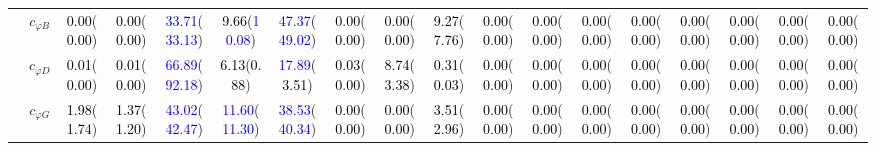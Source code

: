 \documentclass{article}
\begin{document}
\begin{landscape}
\begin{table}[H]
\begin{tabular}{|c|c|c|c|c|c|c|c|c|c|c|c|c|c|c|c|c|c|}
 & $c_{\varphi B}$ & \textcolor{black}{0.00}(\textcolor{black}{0.00}) & \textcolor{black}{0.00}(\textcolor{black}{0.00}) & \textcolor{blue}{33.71}(\textcolor{blue}{33.13}) & \textcolor{black}{9.66}(\textcolor{blue}{10.08}) & \textcolor{blue}{47.37}(\textcolor{blue}{49.02}) & \textcolor{black}{0.00}(\textcolor{black}{0.00}) & \textcolor{black}{0.00}(\textcolor{black}{0.00}) & \textcolor{black}{9.27}(\textcolor{black}{7.76}) & \textcolor{black}{0.00}(\textcolor{black}{0.00}) & \textcolor{black}{0.00}(\textcolor{black}{0.00}) & \textcolor{black}{0.00}(\textcolor{black}{0.00}) & \textcolor{black}{0.00}(\textcolor{black}{0.00}) & \textcolor{black}{0.00}(\textcolor{black}{0.00}) & \textcolor{black}{0.00}(\textcolor{black}{0.00}) & \textcolor{black}{0.00}(\textcolor{black}{0.00}) & \textcolor{black}{0.00}(\textcolor{black}{0.00})\\ \cline{2-18}
 & $c_{\varphi D}$ & \textcolor{black}{0.01}(\textcolor{black}{0.00}) & \textcolor{black}{0.01}(\textcolor{black}{0.00}) & \textcolor{blue}{66.89}(\textcolor{blue}{92.18}) & \textcolor{black}{6.13}(\textcolor{black}{0.88}) & \textcolor{blue}{17.89}(\textcolor{black}{3.51}) & \textcolor{black}{0.03}(\textcolor{black}{0.00}) & \textcolor{black}{8.74}(\textcolor{black}{3.38}) & \textcolor{black}{0.31}(\textcolor{black}{0.03}) & \textcolor{black}{0.00}(\textcolor{black}{0.00}) & \textcolor{black}{0.00}(\textcolor{black}{0.00}) & \textcolor{black}{0.00}(\textcolor{black}{0.00}) & \textcolor{black}{0.00}(\textcolor{black}{0.00}) & \textcolor{black}{0.00}(\textcolor{black}{0.00}) & \textcolor{black}{0.00}(\textcolor{black}{0.00}) & \textcolor{black}{0.00}(\textcolor{black}{0.00}) & \textcolor{black}{0.00}(\textcolor{black}{0.00})\\ \cline{2-18}
 & $c_{\varphi G}$ & \textcolor{black}{1.98}(\textcolor{black}{1.74}) & \textcolor{black}{1.37}(\textcolor{black}{1.20}) & \textcolor{blue}{43.02}(\textcolor{blue}{42.47}) & \textcolor{blue}{11.60}(\textcolor{blue}{11.30}) & \textcolor{blue}{38.53}(\textcolor{blue}{40.34}) & \textcolor{black}{0.00}(\textcolor{black}{0.00}) & \textcolor{black}{0.00}(\textcolor{black}{0.00}) & \textcolor{black}{3.51}(\textcolor{black}{2.96}) & \textcolor{black}{0.00}(\textcolor{black}{0.00}) & \textcolor{black}{0.00}(\textcolor{black}{0.00}) & \textcolor{black}{0.00}(\textcolor{black}{0.00}) & \textcolor{black}{0.00}(\textcolor{black}{0.00}) & \textcolor{black}{0.00}(\textcolor{black}{0.00}) & \textcolor{black}{0.00}(\textcolor{black}{0.00}) & \textcolor{black}{0.00}(\textcolor{black}{0.00}) & \textcolor{black}{0.00}(\textcolor{black}{0.00})\\ \cline{2-18}

\end{tabular}
\end{table}
\end{landscape}
\end{document}
